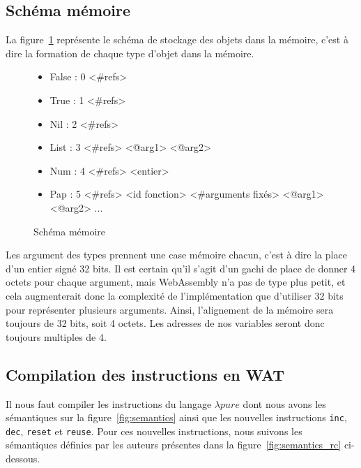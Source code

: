 \documentclass{rapportECL}
\begin{document}
\subsection{Schéma mémoire}

La figure~\ref{listing:memory_wasm} représente le schéma de stockage des objets dans la mémoire, c'est à dire la formation
de chaque type d'objet dans la mémoire.


\begin{figure}[H]
	\begin{itemize}
		\item False : 0 <\#refs>
		\item True  : 1 <\#refs>
		\item Nil   : 2 <\#refs>
		\item List  : 3 <\#refs> <@arg1> <@arg2>
		\item Num   : 4 <\#refs> <entier>
		\item Pap   : 5 <\#refs> <id fonction> <\#arguments fixés> <@arg1> <@arg2> ...
	\end{itemize}
	\caption{Schéma mémoire}
	\label{listing:memory_wasm}
\end{figure}

Les argument des types prennent une case mémoire chacun, c'est à dire la place d'un entier signé 32 bits. 
Il est certain qu'il s'agit d'un gachi de place de donner 4 octets pour chaque argument, mais WebAssembly n'a pas de type plus
petit, et cela augmenterait donc la complexité de l'implémentation que d'utiliser 32 bits pour représenter plusieurs arguments.
Ainsi, l'alignement de la mémoire sera toujours de 32 bits, soit 4 octets. Les adresses de nos variables seront donc toujours 
multiples de 4.

\subsection{Compilation des instructions en WAT}

Il nous faut compiler les instructions du langage $\lambda{pure}$ dont nous avons les sémantiques sur la figure~\ref{fig:semantics}
ainsi que les nouvelles instructions \verb|inc|, \verb|dec|, \verb|reset| et \verb|reuse|. Pour ces nouvelles instructions, nous
suivons les sémantiques définies par les auteurs présentes dans la figure~\ref{fig:semantics_rc} ci-dessous.
\end{document}
